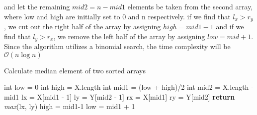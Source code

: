     	and let the remaining $ mid2 = n-mid1$ elements be taken from the second array, where low and high are initially set to 0 and n respectively. if we find that $l_x > r_y$, we cut out the right half of the array by assigning $high = mid1 - 1$ and if we find that $l_y > r_x$, we remove the left half of the array by assigning $low = mid + 1$. Since the algorithm utilizes a binomial search, the time complexity will be $\mathcal{O}(n\log{}n)$
    	\begin{algorithm}[H]
    		\caption{Calculate median element of two sorted arrays}
    		\begin{algorithmic}[1]
    			\State int low = 0
    			\State int high = X.length
	    			\State int mid1 = (low + high)/2
	    			\State int mid2 = X.length - mid1
	    			\State lx = X[mid1 - 1]
	    			\State ly = Y[mid2 - 1]
	    			\State rx = X[mid1]
	    			\State ry = Y[mid2]
	    				\State \textbf{return} \textit{max}(lx, ly)
	    					\State high = mid1-1
	    					\State low = mid1 + 1
	    			\EndIf
    			\EndWhile
    			\EndProcedure
    			
    		\end{algorithmic}
    	\end{algorithm}
